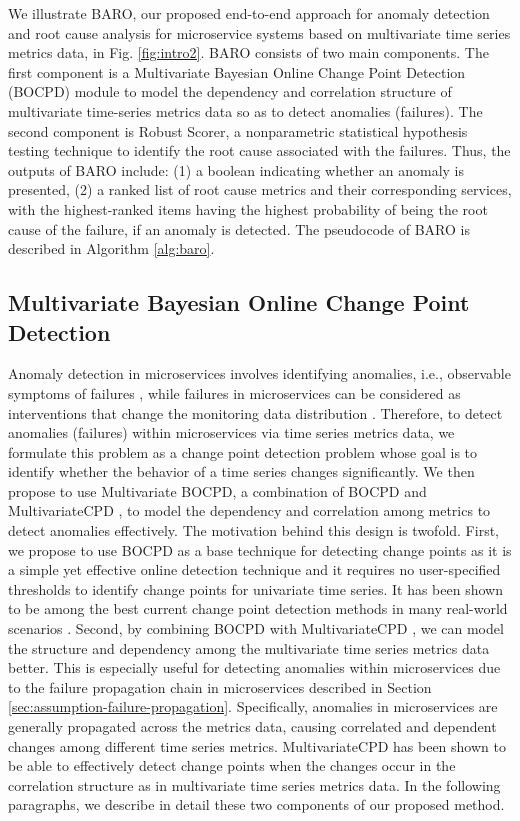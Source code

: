 We illustrate BARO, our proposed end-to-end approach for anomaly detection and root cause analysis for microservice systems based on multivariate time series metrics data, in Fig. \ref{fig:intro2}. BARO consists of two main components. The first component is a Multivariate Bayesian Online Change Point Detection (BOCPD) module to model the dependency and correlation structure of multivariate time-series metrics data so as to detect anomalies (failures). The second component is Robust Scorer, a nonparametric statistical hypothesis testing technique to identify the root cause associated with the failures. Thus, the outputs of BARO include: (1) a boolean indicating whether an anomaly is presented, (2) a ranked list of root cause metrics and their corresponding services, with the highest-ranked items having the highest probability of being the root cause of the failure, if an anomaly is detected. The pseudocode of BARO is described in Algorithm \ref{alg:baro}.


\subsection{Multivariate Bayesian Online Change Point Detection} \label{sec:multi-bocpd}

Anomaly detection in microservices involves identifying anomalies, i.e., observable symptoms of failures \cite{Soldani2022rcasurvey}, while failures in microservices can be considered as interventions that change the monitoring data distribution \cite{Azam2022rcd, Li2022Circa}. Therefore, to detect anomalies (failures) within microservices via time series metrics data, we formulate this problem as a change point detection problem whose goal is to identify whether the behavior of a time series changes significantly. We then propose to use Multivariate BOCPD, a combination of BOCPD \cite{adams2007bayesian} and MultivariateCPD \cite{xuan2007modeling}, to model the dependency and correlation among metrics to detect anomalies effectively. The motivation behind this design is twofold. First, we propose to use BOCPD \cite{adams2007bayesian} as a base technique for detecting change points as it is a simple yet effective online detection technique and it requires no user-specified thresholds to identify change points for univariate time series. It has been shown to be among the best current change point detection methods in many real-world scenarios \cite{Burg2022CPeval}. Second, by combining BOCPD with MultivariateCPD \cite{xuan2007modeling}, we can model the structure and dependency among the multivariate time series metrics data better. This is especially useful for detecting anomalies within microservices due to the failure propagation chain in microservices described in Section \ref{sec:assumption-failure-propagation}. Specifically, anomalies in microservices are generally propagated across the metrics data, causing correlated and dependent changes among different time series metrics. MultivariateCPD has been shown to be able to effectively detect change points when the changes occur in the correlation structure as in multivariate time series metrics data. In the following paragraphs, we describe in detail these two components of our proposed method.



